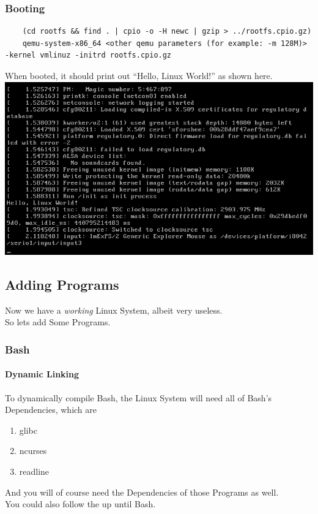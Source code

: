 \documentclass{article}
\begin{document}
			\subsubsection{Booting}
			\begin{lstlisting}
	(cd rootfs && find . | cpio -o -H newc | gzip > ../rootfs.cpio.gz)
	qemu-system-x86_64 <other qemu parameters (for example: -m 128M)> -kernel vmlinuz -initrd rootfs.cpio.gz
			\end{lstlisting}
			When booted, it should print out ``Hello, Linux World!'' as shown here.
			\\
			\includegraphics{hellolinuxworld}
		
		\subsection{Adding Programs}
		Now we have a \textit{working} Linux System, albeit very useless.
		\\
		So lets add Some Programs.
		\subsubsection{Bash}
		\paragraph{Dynamic Linking}
		\label{BashDynamic}
		To dynamically compile Bash, the Linux System will need all of Bash's Dependencies, which are
		\begin{enumerate}
			\item glibc
			\item ncurses
			\item readline
		\end{enumerate}
		And you will of course need the Dependencies of those Programs as well.
		\\
		You could also follow the  up until Bash.
\end{document}

